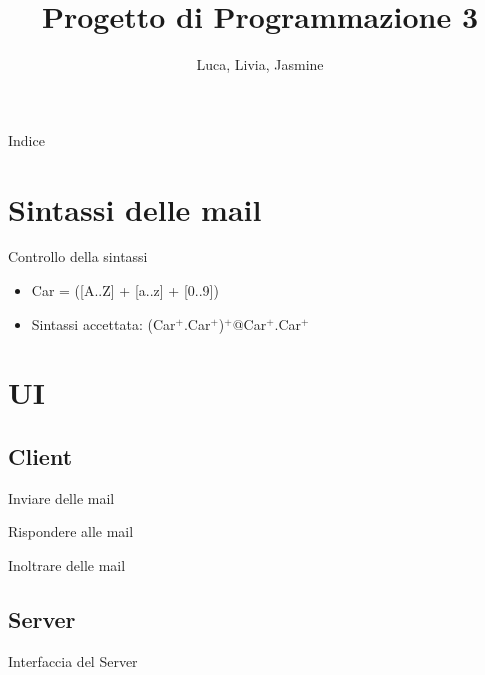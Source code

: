 \documentclass[14pt, aspectratio=169]{beamer}
\title{Progetto di Programmazione 3}
\author{Luca, Livia, Jasmine}
\date{}
\begin{document}
\maketitle

\begin{frame}{Indice}
  \tableofcontents
\end{frame}

\section{Sintassi delle mail}

\begin{frame}{Controllo della sintassi}

  \begin{itemize}
    \item<1-> Car = ([A..Z] + [a..z] + [0..9])
    \item<2-> Sintassi accettata: (Car$^+$.Car$^+$)$^+$@Car$^+$.Car$^+$
  \end{itemize}

\end{frame}

\section{UI}

\subsection{Client}

\begin{frame}{Inviare delle mail}
  
\end{frame}

\begin{frame}{Rispondere alle mail}
  
\end{frame}

\begin{frame}{Inoltrare delle mail}
  
\end{frame}

\subsection{Server}

\begin{frame}{Interfaccia del Server}
  
\end{frame}
\end{document}
